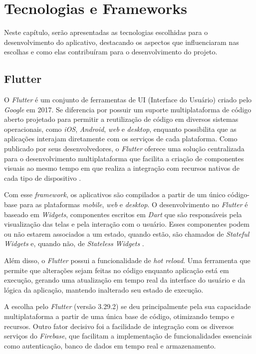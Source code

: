 \chapter{Tecnologias e Frameworks}\label{tecnologias}

Neste capítulo, serão apresentadas as tecnologias escolhidas para o 
desenvolvimento do aplicativo, destacando os aspectos que influenciaram nas 
escolhas e como elas contribuíram para o desenvolvimento do projeto.

\section{Flutter}

O \textit{Flutter} é um conjunto de ferramentas de UI (Interface do Usuário) criado 
pelo \textit{Google} em 2017. Se diferencia por possuir um suporte multiplataforma de código aberto 
projetado para permitir a reutilização de código em diversos sistemas operacionais, como \textit{iOS}, 
\textit{Android}, \textit{web} e \textit{desktop}, enquanto possibilita que as aplicações interajam 
diretamente com os serviços de cada plataforma. Como publicado por seus desenvolvedores, 
o \textit{Flutter} oferece 
uma solução centralizada para o desenvolvimento multiplataforma que facilita a criação de 
componentes visuais ao mesmo tempo em que realiza a integração com recursos nativos de cada tipo 
de dispositivo \cite{flutterDocs2025}.

Com esse \textit{framework}, os aplicativos são compilados a partir de um único código-base para as 
plataformas \textit{mobile}, \textit{web} e \textit{desktop}. O desenvolvimento no \textit{Flutter} é baseado em \textit{Widgets}, 
componentes escritos em \textit{Dart} que são responsáveis pela visualização das telas e pela interação 
com o usuário.
Esses componentes podem ou não estarem associados a um estado, quando estão, são chamados de \textit{Stateful} 
\textit{Widgets} e, quando não, de \textit{Stateless} \textit{Widgets} \cite{flutterDocs2025}.

Além disso, o \textit{Flutter} possui a funcionalidade de \textit{hot reload}. 
Uma ferramenta que permite que alterações sejam feitas no código 
enquanto aplicação está em execução, gerando uma 
atualização em tempo real da interface do usuário e da lógica da aplicação, 
mantendo inalterado seu estado de execução.

A escolha pelo \textit{Flutter} (versão 3.29.2) se deu principalmente pela sua capacidade multiplataforma a partir de 
uma única base de código, otimizando tempo e recursos. Outro fator decisivo foi a 
facilidade de integração com os diversos serviços do \textit{Firebase}, 
que facilitam a implementação de funcionalidades essenciais 
como autenticação, banco de dados em tempo real e armazenamento.

